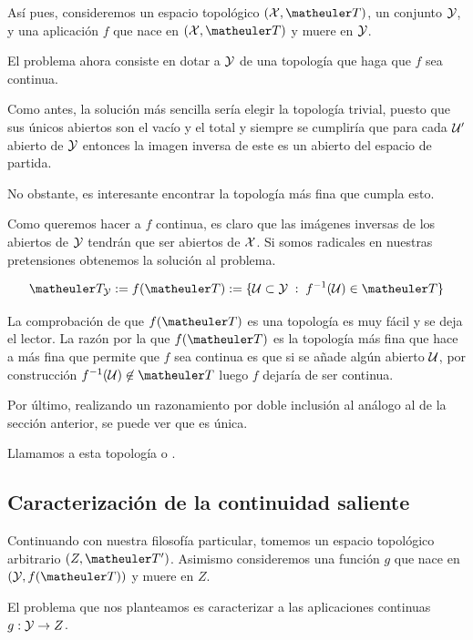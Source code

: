 Así pues, consideremos un espacio topológico $(\X,\T)$, un conjunto $\mathcal{Y}$, y una aplicación $f$ que nace en $(\X,\T)$ y muere en $\mathcal{Y}$.

El problema ahora consiste en dotar a $\mathcal{Y}$ de una topología que haga que $f$ sea continua.

\begin{obs}
	Como antes, la solución más sencilla sería elegir la topología trivial, puesto que sus únicos abiertos son el vacío y el total y siempre se cumpliría que para cada $\mathcal{U}'$ abierto de $\mathcal{Y}$ entonces la imagen inversa de este es un abierto del espacio de partida.
\end{obs}

No obstante, es interesante encontrar la topología más fina que cumpla esto.

Como queremos hacer a $f$ continua, es claro que las imágenes inversas de los abiertos de $\mathcal{Y}$ tendrán que ser abiertos de $\mathcal{X}$. Si somos radicales en nuestras pretensiones obtenemos la solución al problema.

\[\T_\Y:=f(\T):=\{\U\subset \Y\midc f^{-1}(\U)\in \T\}\]

La comprobación de que $f(\T)$ es una topología es muy fácil y se deja el lector. La razón por la que $f(\T)$ es la topología más fina que hace a más fina que permite que $f$ sea continua es que si se añade algún abierto $\mathcal{U}$, por construcción $f^{-1}(\U)\not\in\T$ luego $f$ dejaría de ser continua.

Por último, realizando un razonamiento por doble inclusión al análogo al de la sección anterior, se puede ver que es única.

Llamamos a esta topología  o .

\subsection{Caracterización de la continuidad saliente}
Continuando con nuestra filosofía particular, tomemos un espacio topológico arbitrario $(Z,\T')$. Asimismo consideremos una función $g$ que nace en $(\Y,f(\T))$ y muere en $Z$.

El problema que nos planteamos es caracterizar a las aplicaciones continuas $g:\mathcal{Y}\to Z$.

